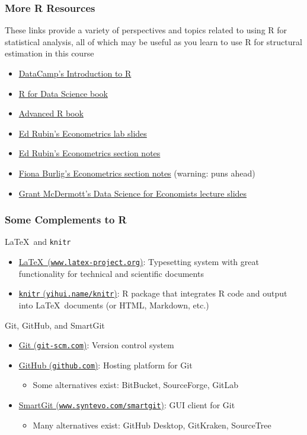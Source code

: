 \documentclass{beamer}\usepackage[]{graphicx}\usepackage[]{color}
\begin{document}
\begin{frame}\frametitle{More R Resources}
    These links provide a variety of perspectives and topics related to using R for statistical analysis, all of which may be useful as you learn to use R for structural estimation in this course
    \begin{itemize}
        \item \href{https://www.datacamp.com/courses/free-introduction-to-r}{DataCamp's Introduction to R}
        \item \href{https://r4ds.had.co.nz/}{R for Data Science book}
        \item \href{https://adv-r.hadley.nz/}{Advanced R book}
        \item \href{https://github.com/edrubin/EC525S19}{Ed Rubin's Econometrics lab slides}
        \item \href{http://edrub.in/ARE212/notes.html}{Ed Rubin's Econometrics section notes}
        \item \href{https://www.fionaburlig.com/teaching/are212}{Fiona Burlig's Econometrics section notes} (warning: puns ahead)
        \item \href{https://github.com/uo-ec607/lectures}{Grant McDermott's Data Science for Economists lecture slides}
    \end{itemize}
\end{frame}

\begin{frame}\frametitle{Some Complements to R}
    \LaTeX\ and \texttt{knitr}
    \begin{itemize}
        \item \href{https://www.latex-project.org/}{\LaTeX\ (\texttt{www.latex-project.org})}: Typesetting system with great functionality for technical and scientific documents
        \item \href{https://yihui.name/knitr/}{\texttt{knitr} (\texttt{yihui.name/knitr})}: R package that integrates R code and output into \LaTeX\ documents (or HTML, Markdown, etc.)
    \end{itemize}
    \vspace{3ex}
    Git, GitHub, and SmartGit
    \begin{itemize}
        \item \href{https://git-scm.com/}{Git (\texttt{git-scm.com})}: Version control system
        \item \href{https://github.com/}{GitHub (\texttt{github.com})}: Hosting platform for Git
        \begin{itemize}
            \item Some alternatives exist: BitBucket, SourceForge, GitLab
        \end{itemize}
        \item \href{https://www.syntevo.com/smartgit/}{SmartGit (\texttt{www.syntevo.com/smartgit})}: GUI client for Git
        \begin{itemize}
            \item Many alternatives exist: GitHub Desktop, GitKraken, SourceTree
        \end{itemize}
    \end{itemize}
\end{frame}
\end{document}
